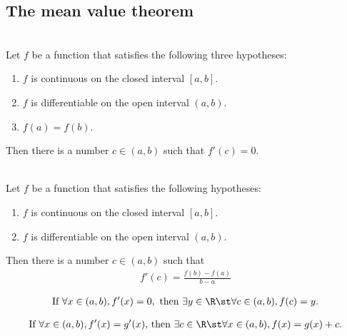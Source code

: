 \documentclass{article}
\begin{document}
\subsection{The mean value theorem}
\begin{theorem}
    \\
    Let $f$ be a function that satisfies the following three hypotheses:
    \begin{enumerate}
        \item $f$ is continuous on the closed interval $[a,b]$.
        \item $f$ is differentiable on the open interval $(a,b)$.
        \item $f(a)=f(b)$.
    \end{enumerate}
    Then there is a number $c \in (a,b)$ such that $f'(c)=0$.
\end{theorem}
\begin{theorem}
    \\
    Let $f$ be a function that satisfies the following hypotheses:
    \begin{enumerate}
        \item $f$ is continuous on the closed interval $[a,b]$.
        \item $f$ is differentiable on the open interval $(a,b)$.
    \end{enumerate}
    Then there is a number $c\in(a,b)$ such that
    \begin{align*}
        f'(c)=\frac{f(b)-f(a)}{b-a}
    \end{align*}
\end{theorem}
\begin{theorem}
    \begin{align*}
        \text{If }
        \forall x\in(a,b), f'(x)=0, 
        \text{ then } 
        \exists y\in\R\st\forall c\in(a,b), f(c)=y.
    \end{align*}
\end{theorem}
\begin{theorem}
    \begin{align*}
        \text{If }\forall x\in(a,b), f'(x)=g'(x)\text{, then } \exists c\in\R \st\forall x\in (a,b), f(x)=g(x)+c.
    \end{align*}
\end{theorem}
\end{document}
